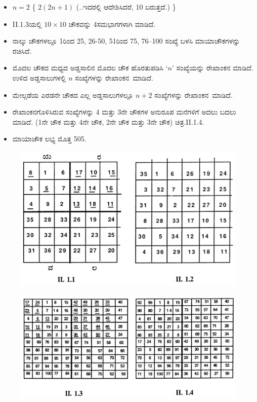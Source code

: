 \begin{itemize}
	\item $n=2$ \{ $2(2n+1)$ (..ಇದರಲ್ಲಿ ಆದೇಶಿಸಿದರೆ, 10 ಬರುತ್ತದೆ.) \}
	\item II.1.3ಯಲ್ಲಿ $10\times 10$ ಚೌಕವನ್ನು 4ಸಮಭಾಗಗಳಾಗಿ ಮಾಡಿದೆ.
	\item ನಾಲ್ಕು ಚೌಕಗಳಲ್ಲೂ 1ರಿಂದ 25, 26-50, 51ರಿಂದ 75, 76--100 ಸಂಖ್ಯೆ ಬಳಸಿ ಮಾಯಾಚೌಕಗಳನ್ನು ರಚಿಸಿದೆ.
	\item ಮೊದಲ ಚೌಕದ ಮಧ್ಯದ ಅಡ್ಡಸಾಲಿನ ಮೊದಲ ಚೌಕ ಹೊರತುಪಡಿಸಿ $‘n’$ ಸಂಖ್ಯೆ\-ಯನ್ನು ರೇಖಾಂಕನ ಮಾಡಿದೆ. ಉಳಿದ ಅಡ್ಡಸಾಲುಗಳಲ್ಲಿ $n$ ಸಂಖ್ಯೆಗಳನ್ನು \hbox{ರೇಖಾಂಕನ ಮಾಡಿದೆ.}
	\item ಮೇಲ್ಗಡೆಯ ಎರಡನೇ ಚೌಕದ ಎಲ್ಲ ಅಡ್ಡಸಾಲುಗಳಲ್ಲೂ $n+2$ ಸಂಖ್ಯೆಗಳನ್ನು \hbox{ರೇಖಾಂಕನ ಮಾಡಿದೆ.}
	\item ರೇಖಾಂಕನಗೊಳಿಸಿರುವ ಸಂಖ್ಯೆಗಳನ್ನು 4 ಮತ್ತು 3ನೇ ಚೌಕಗಳ ಅನುರೂಪ ಮನೆ\-ಗಳಿಗೆ ಅದಲು ಬದಲು ಮಾಡಿದೆ. (1ನೇ ಚೌಕ ಮತ್ತು 4ನೇ ಚೌಕ, 2ನೇ ಚೌಕ ಮತ್ತು 3ನೇ ಚೌಕ) ಚಿತ್ರ.II.1.4.
	\item ಮಾಯಾಚೌಕ ಲಭ್ಯ ಮೊತ್ತ 505.
\end{itemize}
\begin{figure}[H]
\includegraphics{src/figures/chap3/fig3-14.jpg}
\end{figure}
\begin{figure}[H]
\includegraphics[scale=1]{src/figures/chap3/fig3-15.jpg}
\end{figure}

